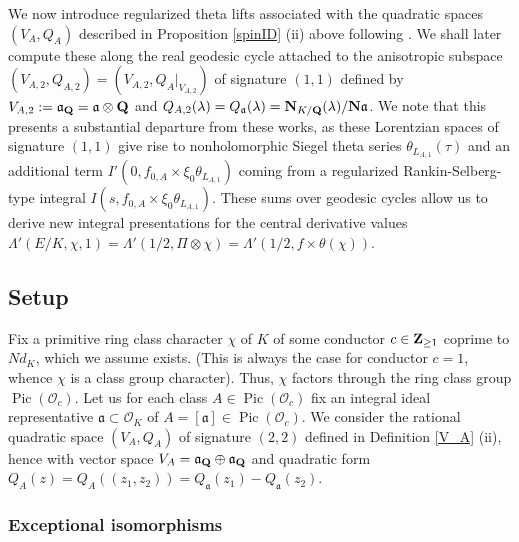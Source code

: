 \documentclass{amsart}
\theoremstyle{definition}
\begin{document}
We now introduce regularized theta lifts associated with the quadratic spaces $(V_A, Q_A)$ described in Proposition \ref{spinID} (ii) 
above following \cite{Bo, KuBL, BrB, BF, BY}. We shall later compute these along the real geodesic cycle attached to the anisotropic subspace 
$(V_{A, 2}, Q_{A, 2}) = (V_{A,2}, Q_{A}\vert_{V_{A,2}})$ of signature $(1,1)$ defined by $V_{A, 2} := \mathfrak{a}_{\bf{Q}} = \mathfrak{a} \otimes {\bf{Q}}$
and $Q_{A, 2}(\lambda) = Q_{\mathfrak{a}}(\lambda) = {\bf{N}}_{K/{\bf{Q}}}(\lambda)/{\bf{N}} \mathfrak{a}$.
We note that this presents a substantial departure from these works, as these Lorentzian 
spaces of signature $(1,1)$ give rise to nonholomorphic Siegel theta series $\theta_{L_{A,1}}(\tau)$ and an additional term
$I'(0, f_{0,A} \times \xi_0 \theta_{L_{A,1}})$ coming from a regularized Rankin-Selberg-type integral $I(s, f_{0,A} \times \xi_0 \theta_{L_{A,1}})$.
These sums over geodesic cycles allow us to derive new integral presentations for the central derivative values 
$\Lambda'(E/K, \chi, 1) = \Lambda'(1/2, \Pi \otimes \chi) = \Lambda'(1/2, f \times \theta(\chi))$. 

\subsection{Setup} 

Fix a primitive ring class character $\chi$ of $K$ of some conductor $c \in {\bf{Z}}_{\geq 1}$ coprime to $N d_K$, 
which we assume exists. (This is always the case for conductor $c=1$, whence $\chi$ is a class group character). 
Thus, $\chi$ factors through the ring class group $\operatorname{Pic}(\mathcal{O}_c)$. 
Let us for each class $A \in \operatorname{Pic}(\mathcal{O}_c)$ 
fix an integral ideal representative $\mathfrak{a} \subset \mathcal{O}_K$
of $A = [\mathfrak{a}] \in \operatorname{Pic}(\mathcal{O}_c)$. 
We consider the rational quadratic space $(V_A, Q_A)$ of signature $(2, 2)$ defined in Definition \ref{V_A} (ii),
hence with vector space $V_A = \mathfrak{a}_{\bf{Q}} \oplus \mathfrak{a}_{\bf{Q}}$ 
and quadratic form $Q_A(z) = Q_A((z_1, z_2)) = Q_{\mathfrak{a}}(z_1) - Q_{\mathfrak{a}}(z_2)$.

\subsubsection{Exceptional isomorphisms}
\end{document}
